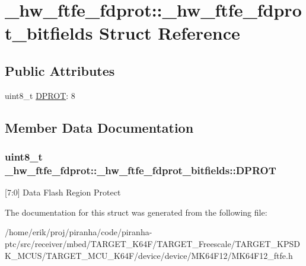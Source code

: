 \hypertarget{struct__hw__ftfe__fdprot_1_1__hw__ftfe__fdprot__bitfields}{}\section{\+\_\+hw\+\_\+ftfe\+\_\+fdprot\+:\+:\+\_\+hw\+\_\+ftfe\+\_\+fdprot\+\_\+bitfields Struct Reference}
\label{struct__hw__ftfe__fdprot_1_1__hw__ftfe__fdprot__bitfields}
\subsection*{Public Attributes}
\begin{DoxyCompactItemize}
\item 
uint8\+\_\+t \hyperlink{struct__hw__ftfe__fdprot_1_1__hw__ftfe__fdprot__bitfields_a5a787b98dcb9e17f0943de7683f78d98}{D\+P\+R\+OT}\+: 8
\end{DoxyCompactItemize}


\subsection{Member Data Documentation}
\subsubsection[{\texorpdfstring{D\+P\+R\+OT}{DPROT}}]{\setlength{\rightskip}{0pt plus 5cm}uint8\+\_\+t \+\_\+hw\+\_\+ftfe\+\_\+fdprot\+::\+\_\+hw\+\_\+ftfe\+\_\+fdprot\+\_\+bitfields\+::\+D\+P\+R\+OT}\hypertarget{struct__hw__ftfe__fdprot_1_1__hw__ftfe__fdprot__bitfields_a5a787b98dcb9e17f0943de7683f78d98}{}\label{struct__hw__ftfe__fdprot_1_1__hw__ftfe__fdprot__bitfields_a5a787b98dcb9e17f0943de7683f78d98}
\mbox{[}7\+:0\mbox{]} Data Flash Region Protect 

The documentation for this struct was generated from the following file\+:\begin{DoxyCompactItemize}
\item 
/home/erik/proj/piranha/code/piranha-\/ptc/src/receiver/mbed/\+T\+A\+R\+G\+E\+T\+\_\+\+K64\+F/\+T\+A\+R\+G\+E\+T\+\_\+\+Freescale/\+T\+A\+R\+G\+E\+T\+\_\+\+K\+P\+S\+D\+K\+\_\+\+M\+C\+U\+S/\+T\+A\+R\+G\+E\+T\+\_\+\+M\+C\+U\+\_\+\+K64\+F/device/device/\+M\+K64\+F12/M\+K64\+F12\+\_\+ftfe.\+h\end{DoxyCompactItemize}
